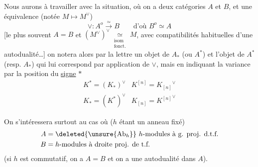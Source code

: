 Nous aurons à travailler avec la situation, où on a deux catégories $A$ et $B$, et une équivalence (notée \deleted{$\unsure{\vee^*}$} $M\mapsto M^\vee$)
\[ \vee:A^o\overset\simeq\longrightarrow B\qquad\text{d'où }B^o\simeq A \]
[le plus souvent $A=B$ et $(M^\vee)^\vee\underset{\substack{\text{isom}\\\text{fonct.}}}{\simeq}M$, avec compatibilités habituelles d'une autodualité\ldots]
on notera alors  par la  lettre un objet de $A_*$ (ou $A^*$) et l'objet de $A^*$ (resp. $A_*$) qui lui correspond par application de $\vee$, mais en indiquant la variance par la position du \uline{signe} $*$
\[
\begin{array}{ll}
K^*=(K_*)^\vee&K^{[n]}={K_{[n]}}^\vee\\
K_*=(K^*)^\vee&K_{[n]}={K^{[n]}}^\vee
\end{array}
\]

On s'intéressera surtout au cas où ($h$ étant un anneau fixé) 
\[
\begin{aligned}
A&=\deleted{\unsure{\mathrm{Ab}_h}}\ h\text{-modules à g. proj. d.t.f.}\\
B&=h\text{-modules à droite proj. de t.f.}
\end{aligned}
\]
(si $h$ est commutatif, on a $A=B$ et on a une autodualité dans $A$).

